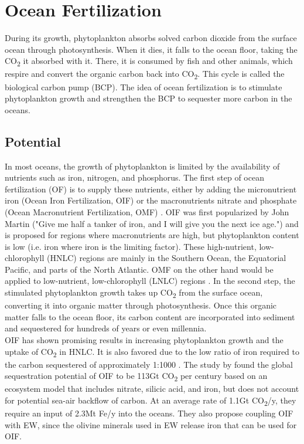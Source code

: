 \section{Ocean Fertilization}
During its growth, phytoplankton absorbs solved carbon dioxide from the surface ocean through photosynthesis. When it dies, it falls to the ocean floor, taking the CO\textsubscript{2} it absorbed with it. There, it is consumed by fish and other animals, which respire and convert the organic carbon back into CO\textsubscript{2}. This cycle is called the biological carbon pump (BCP). The idea of ocean fertilization is to stimulate phytoplankton growth and strengthen the BCP to sequester more carbon in the oceans.
\subsection*{Potential}
In most oceans, the growth of phytoplankton is limited by the availability of nutrients such as iron, nitrogen, and phosphorus. The first step of ocean fertilization (OF) is to supply these nutrients, either by adding the micronutrient iron (Ocean Iron Fertilization, OIF) or the macronutrients nitrate and phosphate (Ocean Macronutrient Fertilization, OMF) \parencite[77]{NationalAcademiesofSciences2022ASequestration}.
OIF was first popularized by John Martin ("Give me half a tanker of iron, and I will give you the next ice age.") and is proposed for regions where macronutrients are high, but phytoplankton content is low (i.e. iron where iron is the limiting factor). These high-nutrient, low-chlorophyll (HNLC) regions are mainly in the Southern Ocean, the Equatorial Pacific, and parts of the North Atlantic. OMF on the other hand would be applied to low-nutrient, low-chlorophyll (LNLC) regions \parencite{Chisholm2001Dis-CreditingFertilization}.
In the second step, the stimulated phytoplankton growth takes up CO\textsubscript{2} from the surface ocean, converting it into organic matter through photosynthesis. Once this organic matter falls to the ocean floor, its carbon content are incorporated into sediment and sequestered for hundreds of years or even millennia. \parencite{Fuss2018NegativeEffects, S.F.Jones2014TheNourishment}\\
OIF has shown promising results in increasing phytoplankton growth and the uptake of CO\textsubscript{2} in HNLC. It is also favored due to the low ratio of iron required to the carbon sequestered of approximately 1:1000 \parencite[99]{NationalAcademiesofSciences2022ASequestration}.
The study by \textcite{Hauck2016IronExperiment} found the global sequestration potential of OIF to be 113Gt CO\textsubscript{2} per century based on an ecosystem model that includes nitrate, silicic acid, and iron, but does not account for potential sea-air backflow of carbon. At an average rate of 1.1Gt CO\textsubscript{2}/y, they require an input of 2.3Mt Fe/y into the oceans. They also propose coupling  OIF with EW, since the olivine minerals used in EW release iron that can be used for OIF.

